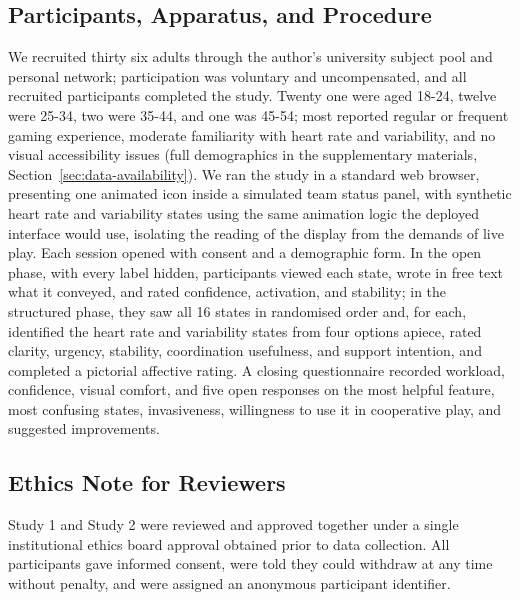 \documentclass[manuscript,review,anonymous]{acmart}
\begin{document}
\subsection{Participants, Apparatus, and Procedure}
We recruited thirty six adults through the author's university subject pool and personal network; participation was voluntary and uncompensated, and all recruited participants completed the study. Twenty one were aged 18-24, twelve were 25-34, two were 35-44, and one was 45-54; most reported regular or frequent gaming experience, moderate familiarity with heart rate and variability, and no visual accessibility issues (full demographics in the supplementary materials, Section~\ref{sec:data-availability}). We ran the study in a standard web browser, presenting one animated icon inside a simulated team status panel, with synthetic heart rate and variability states using the same animation logic the deployed interface would use, isolating the reading of the display from the demands of live play. Each session opened with consent and a demographic form. In the open phase, with every label hidden, participants viewed each state, wrote in free text what it conveyed, and rated confidence, activation, and stability; in the structured phase, they saw all 16 states in randomised order and, for each, identified the heart rate and variability states from four options apiece, rated clarity, urgency, stability, coordination usefulness, and support intention, and completed a pictorial affective rating. A closing questionnaire recorded workload, confidence, visual comfort, and five open responses on the most helpful feature, most confusing states, invasiveness, willingness to use it in cooperative play, and suggested improvements.

\subsection{Ethics Note for Reviewers}
Study 1 and Study 2 were reviewed and approved together under a single institutional ethics board approval obtained prior to data collection. All participants gave informed consent, were told they could withdraw at any time without penalty, and were assigned an anonymous participant identifier.
\end{document}

